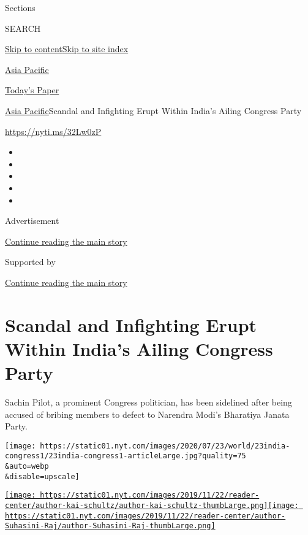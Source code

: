 Sections

SEARCH

\protect\hyperlink{site-content}{Skip to
content}\protect\hyperlink{site-index}{Skip to site index}

\href{https://www.nytimes.com/section/world/asia}{Asia Pacific}

\href{https://myaccount.nytimes.com/auth/login?response_type=cookie\&client_id=vi}{}

\href{https://www.nytimes.com/section/todayspaper}{Today's Paper}

\href{/section/world/asia}{Asia Pacific}\textbar{}Scandal and Infighting
Erupt Within India's Ailing Congress Party

\url{https://nyti.ms/32Lw0zP}

\begin{itemize}
\item
\item
\item
\item
\item
\end{itemize}

Advertisement

\protect\hyperlink{after-top}{Continue reading the main story}

Supported by

\protect\hyperlink{after-sponsor}{Continue reading the main story}

\hypertarget{scandal-and-infighting-erupt-within-indias-ailing-congress-party}{%
\section{Scandal and Infighting Erupt Within India's Ailing Congress
Party}\label{scandal-and-infighting-erupt-within-indias-ailing-congress-party}}

Sachin Pilot, a prominent Congress politician, has been sidelined after
being accused of bribing members to defect to Narendra Modi's Bharatiya
Janata Party.

\texttt{[image: https://static01.nyt.com/images/2020/07/23/world/23india-congress1/23india-congress1-articleLarge.jpg?quality=75\\\&auto=webp\\\&disable=upscale]}

\href{https://www.nytimes.com/by/kai-schultz}{\texttt{[image: https://static01.nyt.com/images/2019/11/22/reader-center/author-kai-schultz/author-kai-schultz-thumbLarge.png]}}\href{https://www.nytimes.com/by/suhasini-raj}{\texttt{[image: https://static01.nyt.com/images/2019/11/22/reader-center/author-Suhasini-Raj/author-Suhasini-Raj-thumbLarge.png]}}

